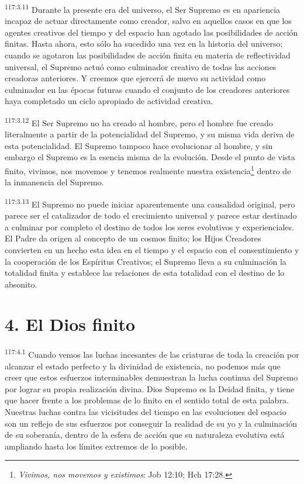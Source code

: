 \documentclass[twoside, 11pt]{book}
\begin{document}
\par
\textsuperscript{117:3.11} Durante la presente era del universo, el Ser Supremo es en apariencia incapaz de actuar directamente como creador, salvo en aquellos casos en que los agentes creativos del tiempo y del espacio han agotado las posibilidades de acción finitas. Hasta ahora, esto sólo ha sucedido una vez en la historia del universo; cuando se agotaron las posibilidades de acción finita en materia de reflectividad universal, el Supremo actuó como culminador creativo de todas las acciones creadoras anteriores. Y creemos que ejercerá de nuevo su actividad como culminador en las épocas futuras cuando el conjunto de los creadores anteriores haya completado un ciclo apropiado de actividad creativa.

\par
\textsuperscript{117:3.12} El Ser Supremo no ha creado al hombre, pero el hombre fue creado literalmente a partir de la potencialidad del Supremo, y su misma vida deriva de esta potencialidad. El Supremo tampoco hace evolucionar al hombre, y sin embargo el Supremo es la esencia misma de la evolución. Desde el punto de vista finito, vivimos, nos movemos y tenemos realmente nuestra existencia\footnote{\textit{Vivimos, nos movemos y existimos}: Job 12:10; Hch 17:28.} dentro de la inmanencia del Supremo.

\par
\textsuperscript{117:3.13} El Supremo no puede iniciar aparentemente una causalidad original, pero parece ser el catalizador de todo el crecimiento universal y parece estar destinado a culminar por completo el destino de todos los seres evolutivos y experienciales. El Padre da origen al concepto de un cosmos finito; los Hijos Creadores convierten en un hecho esta idea en el tiempo y el espacio con el consentimiento y la cooperación de los Espíritus Creativos; el Supremo lleva a su culminación la totalidad finita y establece las relaciones de esta totalidad con el destino de lo absonito.

\section*{4. El Dios finito}
\par
\textsuperscript{117:4.1} Cuando vemos las luchas incesantes de las criaturas de toda la creación por alcanzar el estado perfecto y la divinidad de existencia, no podemos más que creer que estos esfuerzos interminables demuestran la lucha continua del Supremo por lograr su propia realización divina. Dios Supremo es la Deidad finita, y tiene que hacer frente a los problemas de lo finito en el sentido total de esta palabra. Nuestras luchas contra las vicisitudes del tiempo en las evoluciones del espacio son un reflejo de sus esfuerzos por conseguir la realidad de su yo y la culminación de su soberanía, dentro de la esfera de acción que su naturaleza evolutiva está ampliando hasta los límites extremos de lo posible.
\end{document}
